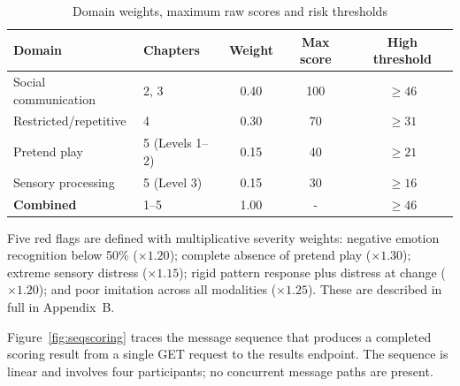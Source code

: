 \documentclass[12pt,a4paper,oneside]{report}
\begin{document}
\begin{table}[t]
  \caption{Domain weights, maximum raw scores and risk thresholds}
  \label{tab:weights}
  \begin{tabularx}{\linewidth}{lXccc}
    \toprule
    \textbf{Domain} & \textbf{Chapters} & \textbf{Weight} & \textbf{Max score} & \textbf{High threshold} \\
    \midrule
    Social communication     & 2, 3           & 0.40 & 100 & $\geq 46$ \\
    Restricted/repetitive    & 4              & 0.30 & 70  & $\geq 31$ \\
    Pretend play             & 5 (Levels 1--2)& 0.15 & 40  & $\geq 21$ \\
    Sensory processing       & 5 (Level 3)    & 0.15 & 30  & $\geq 16$ \\
    \midrule
    \textbf{Combined}        & 1--5           & 1.00 & - & $\geq 46$ \\
    \bottomrule
  \end{tabularx}
\end{table}

Five red flags are defined with multiplicative severity weights: negative emotion recognition below 50\% ($\times1.20$); complete absence of pretend play ($\times1.30$); extreme sensory distress ($\times1.15$); rigid pattern response plus distress at change ($\times1.20$); and poor imitation across all modalities ($\times1.25$). These are described in full in Appendix~B.

Figure~\ref{fig:seqscoring} traces the message sequence that produces a completed scoring result from a single GET request to the results endpoint. The sequence is linear and involves four participants; no concurrent message paths are present.
\end{document}
